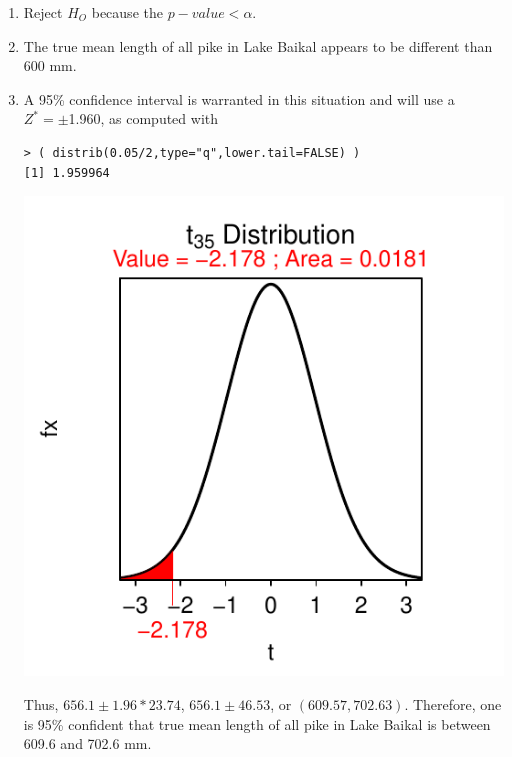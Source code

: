 \documentclass[10pt,openany]{book}\usepackage[]{graphicx}\usepackage[]{color}
\makeatletter
\newenvironment{kframe}{%
 \def\at@end@of@kframe{}%
 \ifinner\ifhmode%
  \def\at@end@of@kframe{\end{minipage}}%
  \begin{minipage}{\columnwidth}%
 \fi\fi%
 \def\FrameCommand##1{\hskip\@totalleftmargin \hskip-\fboxsep
 \colorbox{shadecolor}{##1}\hskip-\fboxsep
     \hskip-\linewidth \hskip-\@totalleftmargin \hskip\columnwidth}%
 \MakeFramed {\advance\hsize-\width
   \@totalleftmargin\z@ \linewidth\hsize
   \@setminipage}}%
 {\par\unskip\endMakeFramed%
 \at@end@of@kframe}
\newenvironment{knitrout}{}{} %
\makeatother
\begin{document}
\begin{itemize}
\begin{enumerate}
\begin{knitrout}
\end{knitrout}
      \item Reject $H_{O}$ because the $p-value<\alpha$.
      \item The true mean length of all pike in Lake Baikal appears to be different than 600 mm.
      \item A 95\% confidence interval is warranted in this situation and will use a $Z^{*}=\pm$1.960, as computed with
\begin{knitrout}
\color{fgcolor}\begin{kframe}
\begin{verbatim}
> ( distrib(0.05/2,type="q",lower.tail=FALSE) )
[1] 1.959964
\end{verbatim}
\end{kframe}

{\centering \includegraphics[width=.4\linewidth]{Figs/unnamed-chunk-354-1} 

}



\end{knitrout}
Thus, $656.1\pm1.96*23.74$, $656.1\pm46.53$, or $(609.57, 702.63)$.  Therefore, one is 95\% confident that true mean length of all pike in Lake Baikal is between 609.6 and 702.6 mm.
    \end{enumerate}


\end{itemize}
\end{document}
